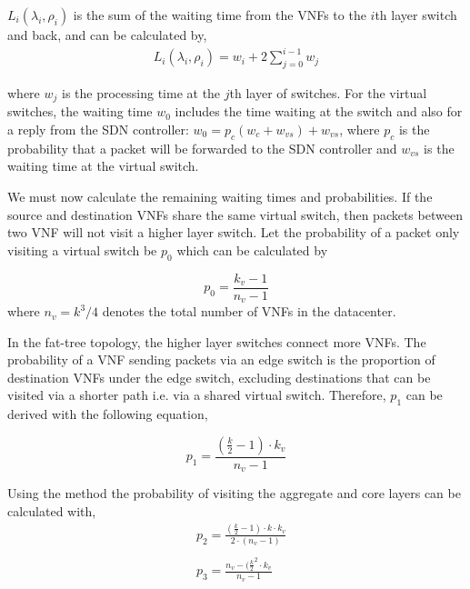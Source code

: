 $L_i(\lambda_i, \rho_i)$ is the sum of the waiting time from the VNFs to the $i$th layer switch and back, and can be calculated by,
\begin{equation}
    \label{eq:latency_path}
    \begin{split}
        L_i(\lambda_i, \rho_i) = w_i + 2 \sum_{j=0}^{i-1} w_j
    \end{split}
\end{equation}

\noindent where $w_j$ is the processing time at the $j$th layer of switches. For the virtual switches, the waiting time $w_0$ includes the time waiting at the switch and also for a reply from the SDN controller: $w_0 = p_c (w_c + w_{vs}) + w_{vs}$, where $p_c$ is the probability that a packet will be forwarded to the SDN controller and $w_{vs}$ is the waiting time at the virtual switch.

We must now calculate the remaining waiting times and probabilities. If the source and destination VNFs share the same virtual switch, then packets between two VNF will not visit a higher layer switch. Let the probability of a packet only visiting a virtual switch be $p_0$ which can be calculated by

\begin{equation}
    \label{eq:p_vm}
    p_{0} = \frac{k_{v} - 1}{n_v - 1}
\end{equation}
\noindent where $n_v = k^3/4$ denotes the total number of VNFs in the datacenter.

In the fat-tree topology, the higher layer switches connect more VNFs. The probability of a VNF sending packets via an edge switch is the proportion of destination VNFs under the edge switch, excluding destinations that can be visited via a shorter path i.e. via a shared virtual switch. Therefore, $p_1$ can be derived with the following equation,

\begin{equation}
    \label{eq:p_edge}
    p_{1} = \frac{\left(\frac{k}{2}-1\right) \cdot k_v}{n_v - 1}
\end{equation}

Using the method the probability of visiting the aggregate and core layers can be calculated with,
\begin{align}
    \label{eq:p_agg_core}
     & p_{2}=\frac { \left(\frac{k}{2}-1\right)\cdot k \cdot k_v }{2 \cdot (n_v-1) } \\ \nonumber \\
     & p_{3} = \frac{n_v - (\frac{k}{2}^2 \cdot k_{v}}{n_v - 1}
\end{align}

